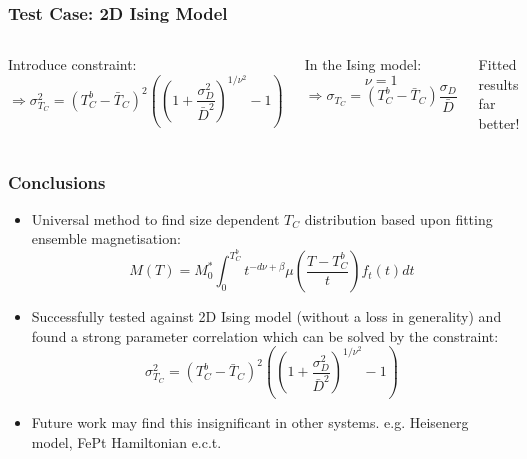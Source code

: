 \documentclass{beamer}
\begin{document}
\begin{frame}
	\frametitle{Test Case: 2D Ising Model}
	\begin{columns}
	\column{7cm}
		Introduce constraint\footnotemark[5]:
		$$
		\Rightarrow \sigma_{T_C}^2 = (T_C^b - \bar{T}_C)^2\left(\left(1 + \frac{\sigma_D^2}{\bar{D}^2}\right)^{1/\nu^2}-1\right)
		$$
		
		In the Ising model:
		$$
		\nu = 1
		$$
		$$
		\Rightarrow \sigma_{T_C} = (T_C^b - \bar{T}_C)\frac{\sigma_D}{\bar{D}}
		$$
		\begin{center}\vspace{2mm}
		
		Fitted results far better!
		\end{center}
	\column{5cm}
		\includegraphics[width=4.5cm]{Images/distros}
		
		\includegraphics[width=4.5cm]{Images/constr}
	\end{columns}
\end{frame}

\begin{frame}
	\frametitle{Conclusions}
	\small{
	\begin{itemize}
		\item{Universal method to find size dependent $T_C$ distribution based upon fitting ensemble magnetisation:}
		$$
		M(T) = M_0^*\int_0^{T_C^b} t^{-d\nu +\beta} \mu\left(\frac{T-T_C^b}{t}\right) f_t(t) dt
		$$
		\item{Successfully tested against 2D Ising model (without a loss in generality) and found a strong parameter correlation which can be solved by the constraint:}
		$$
		\sigma_{T_C}^2 = (T_C^b - \bar{T}_C)^2\left(\left(1 + \frac{\sigma_D^2}{\bar{D}^2}\right)^{1/\nu^2}-1\right)
		$$
		\item{Future work may find this insignificant in other systems. e.g. Heisenerg model, FePt Hamiltonian e.c.t.}
	\end{itemize}}
\end{frame}
\end{document}
